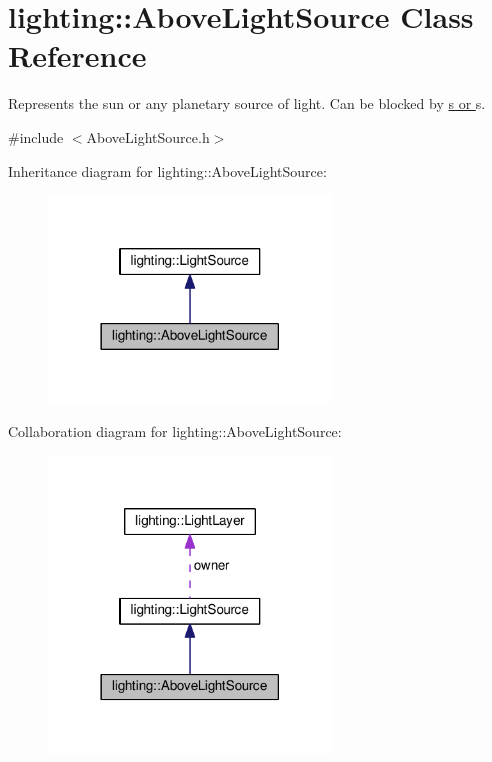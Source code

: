\hypertarget{classlighting_1_1AboveLightSource}{}\section{lighting\+:\+:Above\+Light\+Source Class Reference}
\label{classlighting_1_1AboveLightSource}


Represents the sun or any planetary source of light. Can be blocked by \hyperlink{classlighting_1_1AboveLightBlocker}{s or }s.  




{\ttfamily \#include $<$Above\+Light\+Source.\+h$>$}



Inheritance diagram for lighting\+:\+:Above\+Light\+Source\+:\nopagebreak
\begin{figure}[H]
\begin{center}
\leavevmode
\includegraphics[width=213pt]{classlighting_1_1AboveLightSource__inherit__graph}
\end{center}
\end{figure}


Collaboration diagram for lighting\+:\+:Above\+Light\+Source\+:\nopagebreak
\begin{figure}[H]
\begin{center}
\leavevmode
\includegraphics[width=213pt]{classlighting_1_1AboveLightSource__coll__graph}
\end{center}
\end{figure}
